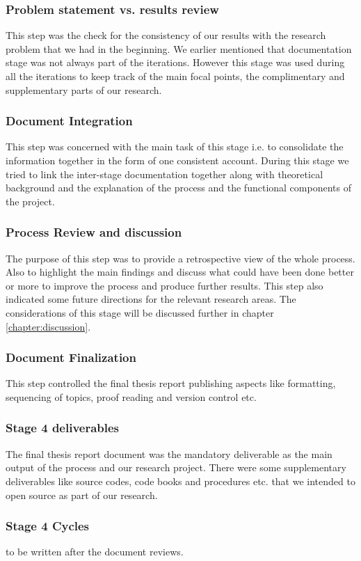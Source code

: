 \subsubsection{Problem statement vs. results review}\label{ps}
This step was the check for the consistency of our results with the research problem that we had in the beginning. We earlier mentioned that documentation stage was not always part of the iterations. However this stage was used during all the iterations to keep track of the main focal points, the complimentary and supplementary parts of our research.    
\subsubsection{Document Integration}
This step was concerned with the main task of this stage i.e. to consolidate the information together in the form of one consistent account. During this stage we tried to link the inter-stage documentation together along with theoretical background and the explanation of the process and the functional components of the project.
\subsubsection{Process Review and discussion}
The purpose of this step was to provide a retrospective view of the whole process. Also to highlight the main findings and discuss what could have been done better or more to improve the process and produce further results. This step also indicated some future directions for the relevant research areas. The considerations of this stage will be discussed further in chapter \ref{chapter:discussion}.
\subsubsection{Document Finalization}
This step controlled the final thesis report publishing aspects like formatting, sequencing of topics, proof reading and version control etc.  
\subsubsection{Stage 4 deliverables}
The final thesis report document was the mandatory deliverable  as the main output of the process and our research project. There were some supplementary deliverables like source codes, code books and procedures etc. that we intended to open source as part of our research.   
\subsubsection{Stage 4 Cycles}
to be written after the document reviews.
